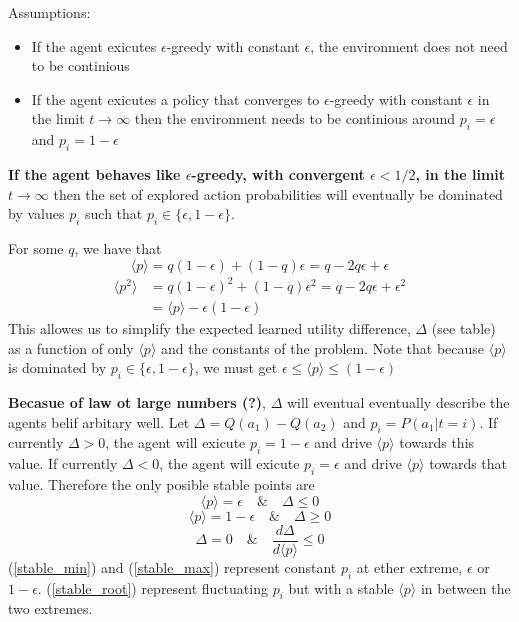 \documentclass[a4paper]{article}
\newcommand{\ep}{\langle p \rangle}
\newcommand{\pp}{\langle p^2 \rangle}
\begin{document}
Assumptions:
\begin{itemize}
	\item If the agent exicutes $\epsilon$-greedy with constant $\epsilon$, the environment does not need to be continious
	\item If the agent exicutes a policy that converges to $\epsilon$-greedy with constant $\epsilon$ in the limit $t\rightarrow\infty$ then the environment needs to be continious around $p_i=\epsilon$ and $p_i=1-\epsilon$
\end{itemize}


\textbf{If the agent behaves like $\epsilon$-greedy, with convergent $\epsilon<1/2$, in the limit $t\rightarrow\infty$} then the set of explored action probabilities will eventually be dominated by values $p_i$ such that $p_i\in\{\epsilon,1-\epsilon\}$.

For some $q$, we have that
\begin{equation}
	\ep = q(1-\epsilon) + (1-q)\epsilon = q - 2q\epsilon + \epsilon
\end{equation}
\begin{align}
	\pp &= q(1-\epsilon)^2 + (1-q)\epsilon^2 = q - 2q\epsilon + \epsilon^2\\
	    &= \ep - \epsilon(1-\epsilon)
\end{align}
This allowes us to simplify the expected learned utility difference, $\Delta$ (see table) as a function of only $\ep$ and the constants of the problem. Note that because $\ep$ is dominated by $p_i\in\{\epsilon,1-\epsilon\}$, we must get $\epsilon\leq\ep\leq(1-\epsilon)$

\textbf{Becasue of law ot large numbers (?)}, $\Delta$ will eventual eventually describe the agents belif arbitary well. Let $\Delta=Q(a_1)-Q(a_2)$ and $p_i = P(a_1|t=i)$. If currently $\Delta>0$, the agent will exicute $p_i=1-\epsilon$ and drive $\ep$ towards this value. If currently $\Delta<0$, the agent will exicute $p_i=\epsilon$ and drive $\ep$ towards that value. Therefore the only posible stable points are
\begin{equation}\label{stable_min}
	\ep = \epsilon \quad \& \quad \Delta\leq0
\end{equation}
\begin{equation}\label{stable_max}
	\ep = 1-\epsilon \quad \& \quad \Delta\geq0
\end{equation}
\begin{equation}\label{stable_root}
	\Delta=0 \quad \& \quad \frac{d\Delta}{d\ep}\leq0
\end{equation}
(\ref{stable_min}) and (\ref{stable_max}) represent constant $p_i$ at ether extreme, $\epsilon$ or $1-\epsilon$. (\ref{stable_root}) represent fluctuating $p_i$ but with a stable $\ep$ in between the two extremes.
\end{document}
